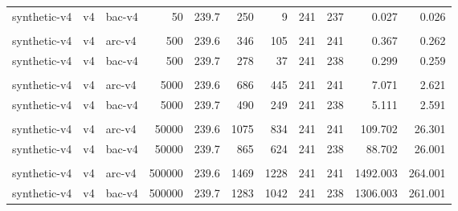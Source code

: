 \begin{table}
\begin{center}
\begin{tabular}{lllrrrrrrrr}
synthetic-v4    & v4       & bac-v4   &      50 &  239.7 &   250 &     9 &   241 &   237 &      0.027 &      0.026 \\
& & & & & & & & & & \\ 
synthetic-v4    & v4       & arc-v4   &     500 &  239.6 &   346 &   105 &   241 &   241 &      0.367 &      0.262 \\
synthetic-v4    & v4       & bac-v4   &     500 &  239.7 &   278 &    37 &   241 &   238 &      0.299 &      0.259 \\
& & & & & & & & & & \\ 
synthetic-v4    & v4       & arc-v4   &    5000 &  239.6 &   686 &   445 &   241 &   241 &      7.071 &      2.621 \\
synthetic-v4    & v4       & bac-v4   &    5000 &  239.7 &   490 &   249 &   241 &   238 &      5.111 &      2.591 \\
& & & & & & & & & & \\ 
synthetic-v4    & v4       & arc-v4   &   50000 &  239.6 &  1075 &   834 &   241 &   241 &    109.702 &     26.301 \\
synthetic-v4    & v4       & bac-v4   &   50000 &  239.7 &   865 &   624 &   241 &   238 &     88.702 &     26.001 \\
& & & & & & & & & & \\ 
synthetic-v4    & v4       & arc-v4   &  500000 &  239.6 &  1469 &  1228 &   241 &   241 &   1492.003 &    264.001 \\
synthetic-v4    & v4       & bac-v4   &  500000 &  239.7 &  1283 &  1042 &   241 &   238 &   1306.003 &    261.001 \\
\end{tabular}
\end{center}
\end{table}
